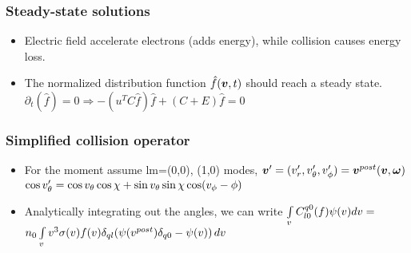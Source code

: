 \documentclass[landscape,archE,fontscale=0.285]{baposter} %
\begin{document}
\begin{poster}
{\begin{multicols}{2}
  \subsubsection*{Steady-state solutions}
  \begin{itemize}
    \item Electric field accelerate electrons (adds energy), while collision causes energy loss.
    \item The normalized distribution function $\hat{f}\of{\vect{v},t}$ should reach a steady state.\\
    $
    \partial_t (\hat{f}) = 0 \Rightarrow -(u^T C \hat{f}) \hat{f} + (C+E)\hat{f} =0
    $%
  \end{itemize}
\columnbreak
\subsubsection*{Simplified collision operator}
\begin{itemize}
  \item For the moment assume lm=(0,0), (1,0) modes, %
  $
  \vect{v}^{\prime} = (v_r^\prime, v_\theta^\prime, v_\phi^\prime) =\vect{v}^{post}\of{\vect{v},\vect{\omega}}$\\
  $
  \cos v_\theta^\prime = \cos v_\theta \cos\chi + \sin v_\theta \sin \chi \cos\of{v_\phi-\phi}
  $
  \item Analytically integrating out the angles, we can write 
  $
  \myint_{v} C^{q0}_{l0}\of{f} \psi(v) dv  = $\\$n_0 \myint_{v} v^3 \sigma\of{v} f\of{v} \delta_{ql}
  \of{\psi\of{v^{post}}\delta_{q0} - \psi\of{v}} \diff{v}$
\end{itemize}

\end{multicols}}
\end{poster}
\end{document}
